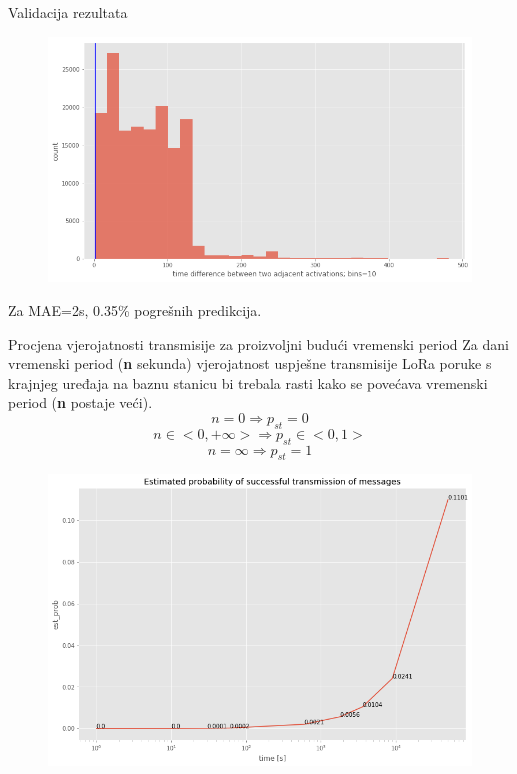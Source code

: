 \documentclass{beamer}
\begin{document}
  \begin{frame}{Validacija rezultata}
    \begin{figure}[]
      \centering
      \includegraphics[width=\linewidth]{images/err_con.png}
    \end{figure}
    Za MAE=2s, 0.35\% pogrešnih predikcija.
  \end{frame}

  \begin{frame}{Procjena vjerojatnosti transmisije za proizvoljni budući vremenski period}
    Za dani vremenski period (\textbf{n} sekunda) vjerojatnost uspješne transmisije LoRa poruke s krajnjeg uređaja na baznu stanicu bi trebala rasti kako se povećava vremenski period (\textbf{n} postaje veći). 
    $$ n = 0 \Rightarrow p_{st} = 0 $$ 
    $$ n \in <0, +\infty> \Rightarrow p_{st} \in <0, 1> $$
    $$ n = \infty \Rightarrow p_{st} = 1 $$

    \end{frame}

  \begin{frame}
    \begin{figure}[]
      \centering
      \includegraphics[width=\linewidth]{images/est-prob.png}
    \end{figure}
  \end{frame}
\end{document}
